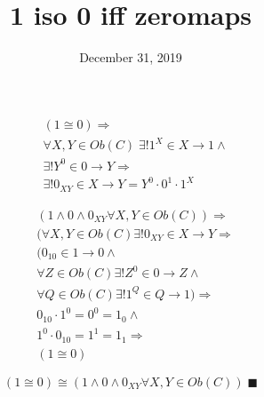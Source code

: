\documentclass[11pt]{article}
\date{December 31, 2019}
\title{1 iso 0 iff zeromaps}
\begin{document}
\begin{equation}
\tag{to}
\begin{aligned}
& (1 \cong 0) \Rightarrow \\
& \forall X, Y \in Ob(C)\; \exists! 1^{X} \in X \rightarrow 1 \land \\
& \exists! Y^{0} \in 0 \rightarrow Y \Rightarrow \\
& \exists! 0_{XY} \in X \rightarrow Y = Y^{0} \cdot 0^{1} \cdot 1^{X}
\end{aligned}
\end{equation}

\begin{equation}
\tag{from}
\begin{aligned}
& (1 \land 0 \land 0_{XY} \forall X, Y \in Ob(C)) \Rightarrow \\
& (\forall X, Y \in Ob(C) \exists! 0_{XY} \in X \rightarrow Y \Rightarrow \\
& (0_{10} \in 1 \rightarrow 0 \land \\
& \forall Z \in Ob(C) \exists! Z^{0} \in 0 \rightarrow Z \land \\
& \forall Q \in Ob(C) \exists! 1^{Q} \in Q \rightarrow 1) \Rightarrow \\
& 0_{10} \cdot 1^{0} = 0^{0} = 1_{0} \land \\
& 1^{0} \cdot 0_{10} = 1^{1} = 1_{1} \Rightarrow \\
& (1 \cong 0)
\end{aligned}
\end{equation}

\hrulefill

$$(1 \cong 0) \cong (1 \land 0 \land 0_{XY} \forall X, Y \in Ob(C)) 
  \;\blacksquare $$
\end{document}
